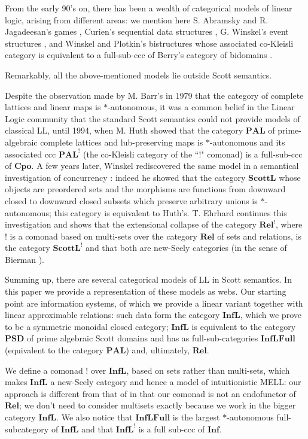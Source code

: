 \documentclass[copyright,creativecommons]{eptcs}
\newcommand{\Psd}{\mathbf{PSD}} \newcommand{\Sd}{\mathbf{SD}} \newcommand{\Palglat}{\mathbf{PAL}} \newcommand{\Cpo}{\mathbf{Cpo}} \newcommand{\Inf}{\mathbf{Inf}} \newcommand{\Inflfull}{\mathbf{InfLFull}} \newcommand{\Scottl}{\mathbf{ScottL}} \newcommand{\Rel}{\mathbf{Rel}} \newcommand{\Infl}{\mathbf{InfL}} \newcommand{\Cl}{Cl}
\begin{document}
From the early 90's on, there has been a wealth of categorical models of linear logic, arising from different areas: we mention here S. Abramsky and R. Jagadeesan's games \cite{Abramsky92}, Curien's sequential data structures \cite{Curien94}, G. Winskel's event structures \cite{Winskel88, Zhang92}, and Winskel and Plotkin's bistructures \cite{Winskel94} whose associated co-Kleisli category is equivalent to a full-sub-ccc of Berry's category of bidomains \cite{Berry79}.

Remarkably, all the above-mentioned models lie outside Scott semantics. 

Despite the observation made by M. Barr's in 1979 \cite{Barr79} that the category of complete lattices and linear maps is $\ast$-autonomous, it was a common belief in the Linear Logic community that the standard Scott semantics could not provide models of classical LL, until 1994, when M. Huth showed \cite{Huth94} that the category $\Palglat$ of prime-algebraic complete lattices and lub-preserving maps is $\ast$-autonomous and its associated ccc $\Palglat^!$ (the co-Kleisli category of the ``!" comonad) is a full-sub-ccc of $\Cpo$. A few years later, Winskel rediscovered the same model in a semantical investigation of concurrency \cite{Winskel99,Winskel04}: indeed he showed that the category $\Scottl$ whose objects are preordered sets and the morphisms are functions from  downward closed to downward closed subsets which preserve arbitrary unions is $\ast$-autonomous; this category is equivalent to Huth's. T. Ehrhard \cite{Ehrhard09} continues this investigation and shows that the extensional collapse of the category $\Rel^!$, where $!$ is a comonad based on multi-sets over the category $\Rel$ of sets and relations, is the category $\Scottl^!$ and that both are new-Seely categories (in the sense of Bierman \cite{Bierman95}).

Summing up, there are several categorical models of LL in Scott semantics. In this paper we provide a representation of these models as webs. Our starting point are information systems, of which we provide a linear variant together with linear approximable relations: such data form the category $\Infl$, which we prove to be a symmetric monoidal closed category; $\Infl$ is equivalent to the category $\Psd$ of prime algebraic Scott domains and has as full-sub-categories $\Inflfull$ (equivalent to the category $\Palglat$) and, ultimately, $\Rel$.

We define a comonad $!$ over $\Infl$, based on sets rather than multi-sets, which makes $\Infl$ a new-Seely category and hence a model of intuitionistic MELL: our approach is different from that of \cite{Ehrhard09} in that our comonad is not an endofunctor of $\Rel$; we don't need to consider multisets exactly because we work in the bigger category $\Infl$. We also notice that $\Inflfull$ is the largest $\ast$-autonomous full-subcategory of $\Infl$ and that $\Infl^!$ is a full sub-ccc of $\Inf$.
\end{document}

